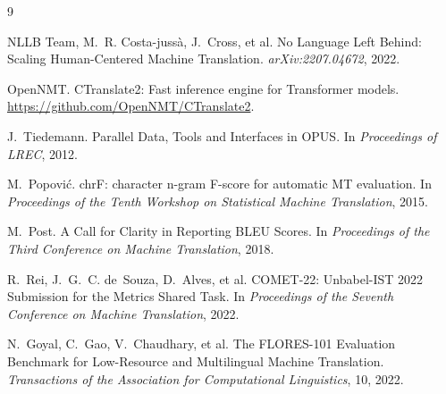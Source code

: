 \begin{thebibliography}{9}

NLLB Team, M.~R. Costa-juss\`a, J.~Cross, et al.
\newblock No Language Left Behind: Scaling Human-Centered Machine Translation.
\newblock \emph{arXiv:2207.04672}, 2022.

OpenNMT.
\newblock CTranslate2: Fast inference engine for Transformer models.
\newblock \url{https://github.com/OpenNMT/CTranslate2}.

J.~Tiedemann.
\newblock Parallel Data, Tools and Interfaces in OPUS.
\newblock In \emph{Proceedings of LREC}, 2012.

M.~Popovi\'c.
\newblock chrF: character n-gram F-score for automatic MT evaluation.
\newblock In \emph{Proceedings of the Tenth Workshop on Statistical Machine Translation}, 2015.

M.~Post.
\newblock A Call for Clarity in Reporting BLEU Scores.
\newblock In \emph{Proceedings of the Third Conference on Machine Translation}, 2018.

R.~Rei, J.~G.~C. de~Souza, D.~Alves, et al.
\newblock COMET-22: Unbabel-IST 2022 Submission for the Metrics Shared Task.
\newblock In \emph{Proceedings of the Seventh Conference on Machine Translation}, 2022.

N.~Goyal, C.~Gao, V.~Chaudhary, et al.
\newblock The FLORES-101 Evaluation Benchmark for Low-Resource and Multilingual Machine Translation.
\newblock \emph{Transactions of the Association for Computational Linguistics}, 10, 2022.

\end{thebibliography}
